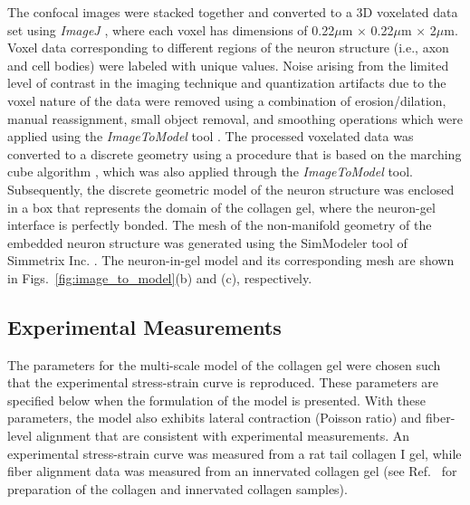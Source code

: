 \documentclass[]{interact}
\begin{document}
The confocal images were stacked together and converted to a 3D voxelated data set using \textit{ImageJ} \citep{Schneider:2012dw}, where each voxel has dimensions of 0.22$\mu$m $\times$ 0.22$\mu$m $\times$ 2$\mu$m. Voxel data corresponding to different regions of the neuron structure (i.e., axon and cell bodies) were labeled with unique values. Noise arising from the limited level of contrast in the imaging technique and quantization artifacts due to the voxel nature of the data were removed using a combination of erosion/dilation, manual reassignment, small object removal, and smoothing operations which were applied using the \textit{ImageToModel} tool \citep{Klaas:2013ug, Klaas_conference, simmetrix}. The processed voxelated data was converted to a discrete geometry using a procedure that is based on the marching cube algorithm \citep{Lorensen:1987vr}, which was also applied through the \textit{ImageToModel} tool. Subsequently, the discrete geometric model of the neuron structure was enclosed in a box that represents the domain of the collagen gel, where the neuron-gel interface is perfectly bonded. The mesh of the non-manifold geometry of the embedded neuron structure was generated using the SimModeler tool of Simmetrix Inc. \citep{simmetrix,Shephard:2000vc}. The neuron-in-gel model and its corresponding mesh are shown in Figs.\ \ref{fig:image_to_model}(b) and (c), respectively. 

\subsection{Experimental Measurements}
The parameters for the multi-scale model of the collagen gel were chosen such that the experimental stress-strain curve is reproduced. These parameters are specified below when the formulation of the model is presented. With these parameters, the model also exhibits lateral contraction (Poisson ratio) and fiber-level alignment that are consistent with experimental measurements. An experimental stress-strain curve was measured from a rat tail collagen I gel, while fiber alignment data was measured from an innervated collagen gel (see Ref.\  for preparation of the collagen and innervated collagen samples). 
\end{document}
